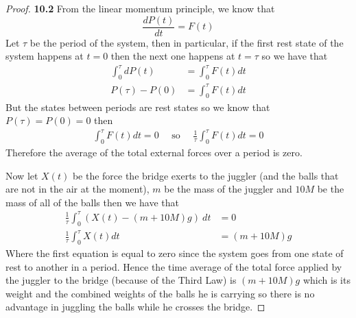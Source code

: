 \documentclass[11pt]{article}
\theoremstyle{definition}
\begin{document}
	\begin{proof}{\textbf{10.2}}
        From the linear momentum principle, we know that 
        $$\frac{dP(t)}{dt} = F(t)$$
        Let $\tau$ be the period of the system, then in particular, if
        the first rest state of the system happens at $t=0$ then the next one
        happens at $t=\tau$ so we have that
        \begin{align*}
            \int_0^\tau dP(t) &= \int_0^\tau F(t) dt\\
            P(\tau) - P(0) &= \int_0^\tau F(t) dt
        \end{align*}
        But the states between periods are rest states so we know that
        $P(\tau) = P(0) = 0$ then
        \begin{align*}
            \int_0^\tau F(t) dt = 0 \quad\text{ so }\quad
            \frac{1}{\tau}\int_0^\tau F(t) dt = 0
        \end{align*}
        Therefore the average of the total external forces over a period is
        zero.

        Now let $X(t)$ be the force the bridge exerts to the juggler (and the
        balls that are not in the air at the moment), $m$ be the mass of the
        juggler and $10M$ be the mass of all of the balls then we have that
        \begin{align*}
            \frac{1}{\tau}\int_0^\tau (X(t) - (m + 10M)g)~dt &= 0\\
            \frac{1}{\tau}\int_0^\tau X(t)dt &= (m + 10M)g
        \end{align*}
        Where the first equation is equal to zero since the system goes from
        one state of rest to another in a period. Hence the time average of
        the total force applied by the juggler to the bridge (because of the
        Third Law) is $(m + 10M)g$ which is its weight and the combined weights
        of the balls he is carrying so there is no advantage in juggling the
        balls while he crosses the bridge. 
    \end{proof}
\cleardoublepage
\end{document}
